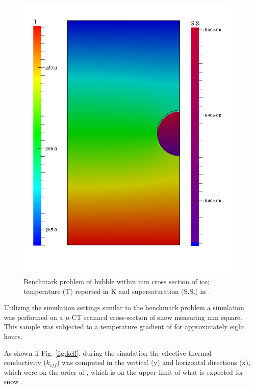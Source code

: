\begin{figure}
  \includegraphics[width=\linewidth]{figures/bubble.pdf}
  \caption{Benchmark problem of bubble within \unit[5]{mm} cross section of ice; temperature (T) reported in \unit[]{K} and supersaturation (S.S.) in .}
  \label{fig:bubble}
\end{figure}

Utilizing the simulation settings similar to the benchmark problem a simulation was performed on a $\mu$-CT scanned cross-section of snow measuring \unit[5]{mm} square. This sample was subjected to a temperature gradient of  for approximately eight hours.

As shown if Fig. \ref{fig:keff}, during the simulation the effective thermal conductivity ($k_{eff}$) was computed in the vertical (y) and horizontal directions (x), which were on the order of , which is on the upper limit of what is expected for snow \citep{sturm1997thermal}.

